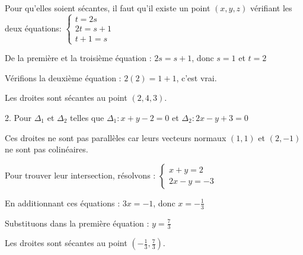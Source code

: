 \documentclass[10pt,a4paper]{article}
\begin{document}
   Pour qu'elles soient sécantes, il faut qu'il existe un point $(x,y,z)$ vérifiant les deux équations:
   $\begin{cases} t = 2s \\ 2t = s+1 \\ t+1 = s \end{cases}$

   De la première et la troisième équation : $2s = s+1$, donc $s=1$ et $t=2$

   Vérifions la deuxième équation : $2(2) = 1+1$, c'est vrai.

   Les droites sont sécantes au point $(2, 4, 3)$.

2. Pour $\Delta_1$ et $\Delta_2$ telles que $\Delta_1 : x + y - 2 = 0$ et $\Delta_2 : 2x - y + 3 = 0$

   Ces droites ne sont pas parallèles car leurs vecteurs normaux $(1,1)$ et $(2,-1)$ ne sont pas colinéaires.

   Pour trouver leur intersection, résolvons :
   $\begin{cases} x + y = 2 \\ 2x - y = -3 \end{cases}$

   En additionnant ces équations : $3x = -1$, donc $x = -\frac{1}{3}$

   Substituons dans la première équation : $y = \frac{7}{3}$

   Les droites sont sécantes au point $(-\frac{1}{3}, \frac{7}{3})$.
\end{document}
